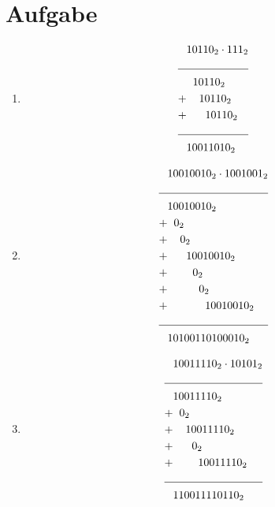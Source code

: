 \documentclass[DIN, pagenumber=false, fontsize=11pt, parskip=half]{scrartcl}
\begin{document}
    \section{Aufgabe}
    \begin{enumerate}[label = (\alph*)]
        \item 
            \begin{align*}
                &{10110}_2 \cdot {111}_2 \\
                \cline{1-2}
                &\hspace{0.2cm}{10110}_2 \\ 
                + &\hspace{0.4cm}  {10110}_2 \\
                + &\hspace{0.6cm} {10110}_2\\
                \cline{1-2}
                &{10011010}_2
            \end{align*}
        \item
            \begin{align*}
                &{10010010}_2 \cdot {1001001}_2 \\
                \cline{1-2}
                &{10010010}_2 \\
                + &\hspace{0.2cm} {0}_2 \\
                + &\hspace{0.4cm} {0}_2 \\
                + &\hspace{0.6cm} {10010010}_2 \\
                + &\hspace{0.8cm} {0}_2 \\
                + &\hspace{1.0cm} {0}_2 \\
                + &\hspace{1.2cm} {10010010}_2 \\
                \cline{1-2}
                &{10100110100010}_2
            \end{align*}
        \item
            \begin{align*}
                &{10011110}_2 \cdot {10101}_2 \\
                \cline{1-2}
                &{10011110}_2 \\
                +&\hspace{0.2cm}0_2 \\
                +&\hspace{0.4cm}{10011110}_2  \\
                +&\hspace{0.6cm}0_2 \\
                +&\hspace{0.8cm}{10011110}_2  \\
                \cline{1-2}
                &{110011110110}_2
            \end{align*}
    \end{enumerate}
\end{document}
